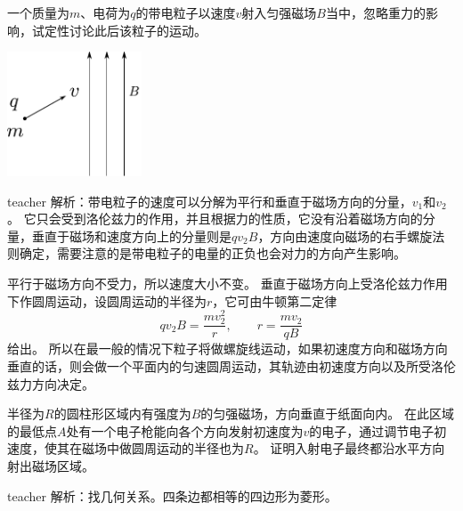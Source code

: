 \begin{example}
一个质量为$m$、电荷为$q$的带电粒子以速度$v$射入匀强磁场$B$当中，忽略重力的影响，试定性讨论此后该粒子的运动。
\begin{flushright}
\includegraphics[width=0.3\textwidth]{images/mag-7.pdf} 
\end{flushright}
\begin{taggedblock}{teacher}
\noindent
解析：带电粒子的速度可以分解为平行和垂直于磁场方向的分量，$v_1$和$v_2$。
它只会受到洛伦兹力的作用，并且根据力的性质，它没有沿着磁场方向的分量，垂直于磁场和速度方向上的分量则是$qv_2B$，方向由速度向磁场的右手螺旋法则确定，需要注意的是带电粒子的电量的正负也会对力的方向产生影响。

平行于磁场方向不受力，所以速度大小不变。
垂直于磁场方向上受洛伦兹力作用下作圆周运动，设圆周运动的半径为$r$，它可由牛顿第二定律
\[qv_2B = \frac{mv_2^2}{r},\qquad r = \frac{mv_2}{qB}\]
给出。
所以在最一般的情况下粒子将做螺旋线运动，如果初速度方向和磁场方向垂直的话，则会做一个平面内的匀速圆周运动，其轨迹由初速度方向以及所受洛伦兹力方向决定。
\end{taggedblock}
\end{example}



\begin{example}

半径为$R$的圆柱形区域内有强度为$B$的匀强磁场，方向垂直于纸面向内。
在此区域的最低点$A$处有一个电子枪能向各个方向发射初速度为$v$的电子，通过调节电子初速度，使其在磁场中做圆周运动的半径也为$R$。
证明入射电子最终都沿水平方向射出磁场区域。
\begin{taggedblock}{teacher}
\newline
解析：找几何关系。四条边都相等的四边形为菱形。
\end{taggedblock}
\end{example}

